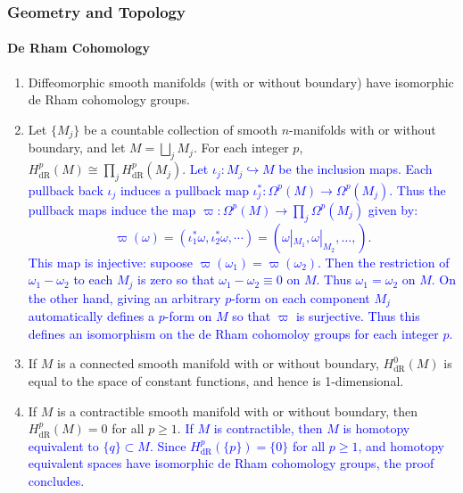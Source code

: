 \documentclass{article}
\newcommand{\expl}[1]{\textcolor{blue}{#1}}
\begin{document}
	\subsubsection{Geometry and Topology}
	\paragraph{De Rham Cohomology}
	\begin{enumerate}
		\item Diffeomorphic smooth manifolds (with or without boundary) have isomorphic de Rham cohomology groups. 
		\item Let $\{M_{j}\}$ be a countable collection of smooth $n$-manifolds with or without boundary, and let $M = \bigsqcup_{j}M_{j}$. For each integer $p$, $H^{p}_{\text{dR}}(M) \cong \prod_{j}H^{p}_{\text{dR}}(M_j)$. \newline 
		\expl{Let $\iota_j: M_j \hookrightarrow M$ be the inclusion maps. Each pullback back $\iota_j$ induces a pullback map $\iota_j^{\ast}: \Omega^{p}(M) \to \Omega^{p}(M_{j})$. Thus the pullback maps induce the map $\varpi: \Omega^{p}(M) \to \prod_{j}\Omega^{p}(M_j)$ given by:
			\begin{equation*}
				\varpi(\omega) = (\iota_1^{\ast}\omega, \iota_2^{\ast}\omega, \dotsm) = (\omega|_{M_{1}}, \omega|_{M_{2}}, \ldots, ). 
			\end{equation*}
			This map is injective: supoose $\varpi(\omega_1) = \varpi(\omega_2)$. Then the restriction of $\omega_1 -\omega_2$ to each $M_j$ is zero so that $\omega_1 - \omega_2 \equiv 0$ on $M$. Thus $\omega_1 = \omega_2$ on $M$. On the other hand, giving an arbitrary $p$-form on each component $M_j$ automatically defines a $p$-form on $M$ so that $\varpi$ is surjective. Thus this defines an isomorphism on the de Rham cohomoloy groups for each integer $p$. 
		}
		
		\item If $M$ is a connected smooth manifold with or without boundary, $H^{0}_{\text{dR}}(M)$ is equal to the space of constant functions, and hence is 1-dimensional. 
		
		\item If $M$ is a contractible smooth manifold with or without boundary, then $H^{p}_{\text{dR}}(M) = 0$ for all $p \geq 1$. \newline \expl{If $M$ is contractible, then $M$ is homotopy equivalent to $\{q\} \subset M$. Since $H^{p}_{\text{dR}}(\{p\}) = \{0\}$ for all $p\geq 1$, and homotopy equivalent spaces have isomorphic de Rham cohomology groups, the proof concludes.}
		

\end{enumerate}
\end{document}
